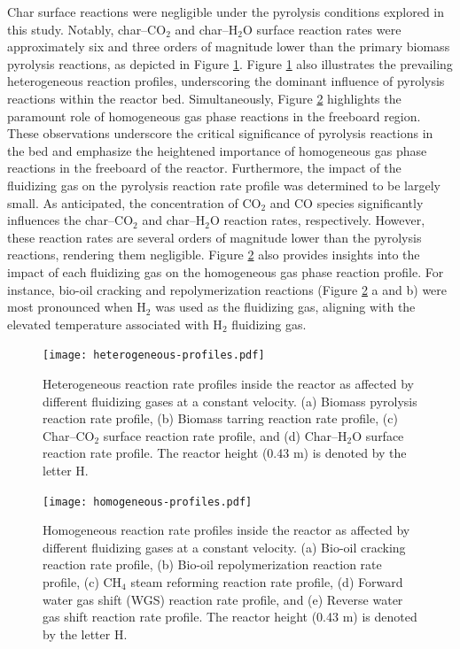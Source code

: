 \documentclass{article}
\begin{document}
Char surface reactions were negligible under the pyrolysis conditions explored in this study. Notably, char--CO$_2$ and char--H$_2$O surface reaction rates were approximately six and three orders of magnitude lower than the primary biomass pyrolysis reactions, as depicted in Figure \ref{fig:heterogeneous-profiles}. Figure \ref{fig:heterogeneous-profiles} also illustrates the prevailing heterogeneous reaction profiles, underscoring the dominant influence of pyrolysis reactions within the reactor bed. Simultaneously, Figure \ref{fig:homogeneous-profiles} highlights the paramount role of homogeneous gas phase reactions in the freeboard region. These observations underscore the critical significance of pyrolysis reactions in the bed and emphasize the heightened importance of homogeneous gas phase reactions in the freeboard of the reactor. Furthermore, the impact of the fluidizing gas on the pyrolysis reaction rate profile was determined to be largely small. As anticipated, the concentration of CO$_2$ and CO species significantly influences the char--CO$_2$ and char--H$_2$O reaction rates, respectively. However, these reaction rates are several orders of magnitude lower than the pyrolysis reactions, rendering them negligible. Figure \ref{fig:homogeneous-profiles} also provides insights into the impact of each fluidizing gas on the homogeneous gas phase reaction profile. For instance, bio-oil cracking and repolymerization reactions (Figure \ref{fig:homogeneous-profiles} a and b) were most pronounced when H$_2$ was used as the fluidizing gas, aligning with the elevated temperature associated with H$_2$ fluidizing gas.

\begin{figure}[H]
    \centering
    \texttt{[image: heterogeneous-profiles.pdf]}
    \caption{Heterogeneous reaction rate profiles inside the reactor as affected by different fluidizing gases at a constant velocity. (a) Biomass pyrolysis reaction rate profile, (b) Biomass tarring reaction rate profile, (c) Char--CO$_2$ surface reaction rate profile, and (d) Char--H$_2$O surface reaction rate profile. The reactor height (0.43 m) is denoted by the letter H.}
    \label{fig:heterogeneous-profiles}
\end{figure}

\begin{figure}[H]
    \centering
    \texttt{[image: homogeneous-profiles.pdf]}
    \caption{Homogeneous reaction rate profiles inside the reactor as affected by different fluidizing gases at a constant velocity. (a) Bio-oil cracking reaction rate profile, (b) Bio-oil repolymerization reaction rate profile, (c) CH$_4$ steam reforming reaction rate profile, (d) Forward water gas shift (WGS) reaction rate profile, and (e) Reverse water gas shift reaction rate profile. The reactor height (0.43 m) is denoted by the letter H.}
    \label{fig:homogeneous-profiles}
\end{figure}
\end{document}
